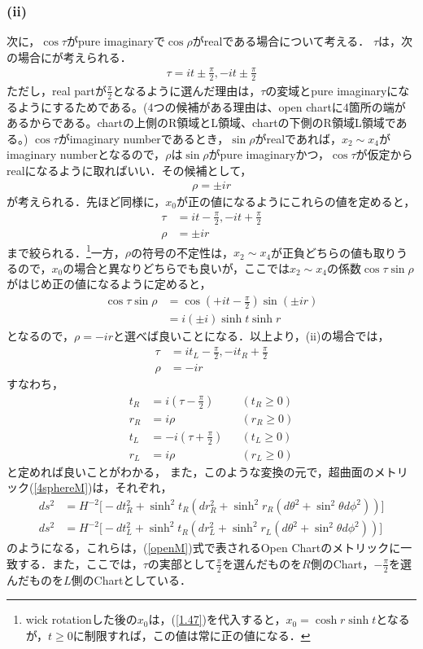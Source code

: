 \subsubsection{(ii)}
次に，$\cos\tau$がpure imaginaryで$\cos\rho$がrealである場合について考える．
$\tau$は，次の場合にが考えられる．
\begin{align}
  \tau=it\pm\frac{\pi}{2},-it\pm\frac{\pi}{2}
\end{align}
ただし，real partが$\frac{\pi}{2}$となるように選んだ理由は，$\tau$の変域とpure imaginaryになるようにするためである。(4つの候補がある理由は、open chartに4箇所の端があるからである。chartの上側のR領域とL領域、chartの下側のR領域L領域である。) $\cos\tau$がimaginary numberであるとき，$\sin\rho$がrealであれば，$x_2 \sim x_4$がimaginary numberとなるので，$\rho$は$\sin\rho$がpure imaginaryかつ，$\cos\tau$が仮定からrealになるように取ればいい．その候補として，
\begin{align}
  \rho=\pm ir
\end{align}
が考えられる．先ほど同様に，$x_0$が正の値になるようにこれらの値を定めると，
\begin{align}
  \label{1.47}
  \tau&=it-\frac{\pi}{2},-it+\frac{\pi}{2} \\
  \label{1.48}
  \rho &= \pm ir
\end{align}
まで絞られる．\footnote{wick rotationした後の$x_0$は，(\ref{1.47})を代入すると，$x_0=\cosh{r}\sinh{t}$となるが，$t \geqslant 0$に制限すれば，この値は常に正の値になる．}一方，$\rho$の符号の不定性は，$x_2\sim x_4$が正負どちらの値も取りうるので，$x_0$の場合と異なりどちらでも良いが，ここでは$x_2\sim x_4$の係数$\cos\tau\sin\rho$がはじめ正の値になるように定めると，
\begin{align}
  \cos\tau\sin\rho&=\cos(+it-\frac{\pi}{2})\sin(\pm ir) \\
  &=i(\pm i)\sinh{t}\sinh{r}
\end{align}
となるので，$\rho=-ir$と選べば良いことになる．以上より，(ii)の場合では，
\begin{align}
  \label{1.49}
  \tau&=it_{L}-\frac{\pi}{2},-it_{R}+\frac{\pi}{2} \\
  \label{1.59}
  \rho&=-ir
\end{align}
すなわち，
\begin{align}
  t_{R}&=i(\tau-\frac{\pi}{2})& &(t_{R} \geqslant 0) \\
  r_{R}&=i\rho& &(r_{R} \geqslant 0) \\
  t_{L}&=-i(\tau+\frac{\pi}{2})& &(t_{L} \geqslant 0) \\
  r_{L}&=i\rho& &(r_{L} \geqslant 0)
\end{align}
と定めれば良いことがわかる，
また，このような変換の元で，超曲面のメトリック(\ref{4sphereM})は，それぞれ，
\begin{align}
  ds^2&=H^{-2}\biggr[-dt_{R}^2+\sinh^2{t_{R}}(dr_{R}^2+\sinh^2r_{R}(d\theta^2+\sin^2\theta d\phi^2))\biggr] \\
ds^2&=H^{-2}\biggr[-dt_{L}^2+\sinh^2{t_{R}}(dr_{L}^2+\sinh^2r_{L}(d\theta^2+\sin^2\theta d\phi^2))\biggr]
\end{align}
のようになる，これらは，(\ref{openM})式で表されるOpen Chartのメトリックに一致する．また，ここでは，$\tau$の実部として$\frac{\pi}{2}$を選んだものを$R$側のChart，$-\frac{\pi}{2}$を選んだものを$L$側のChartとしている．

